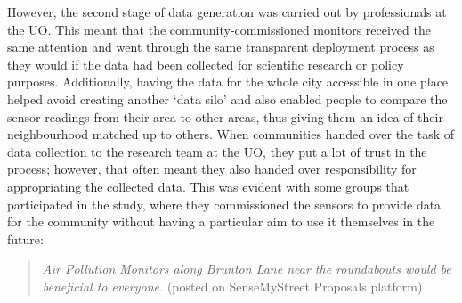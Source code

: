 However, the second stage of data generation was carried out by professionals at the UO. This meant that the community-commissioned monitors received the same attention and went through the same transparent deployment process as they would if the data had been collected for scientific research or policy purposes. Additionally, having the data for the whole city accessible in one place helped avoid creating another `data silo' and also enabled people to compare the sensor readings from their area to other areas, thus giving them an idea of their neighbourhood matched up to others. When communities handed over the task of data collection to the research team at the UO, they put a lot of trust in the process; however, that often meant they also handed over responsibility for appropriating the collected data. This was evident with some groups that participated in the study, where they commissioned the sensors to provide data for the community without having a particular aim to use it themselves in the future:

\begin{quote}
    \textit{Air Pollution Monitors along Brunton Lane near the roundabouts would be beneficial to everyone.} (posted on SenseMyStreet Proposals platform)
\end{quote}

